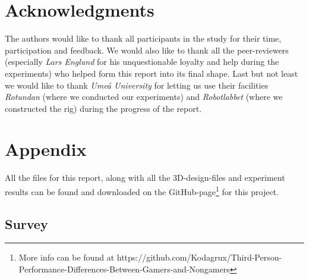 \documentclass[runningheads,a4paper,oribibl]{llncs}
\begin{document}
\section{Acknowledgments}
The authors would like to thank all participants in the study for their time, participation and feedback. We would also like to thank all the peer-reviewers (especially \emph{Lars Englund} for his unquestionable loyalty and help during the experiments) who helped form this report into its final shape. Last but not least we would like to thank \emph{Umeå University} for letting us use their facilities \emph{Rotundan} (where we conducted our experiments) and \emph{Robotlabbet} (where we constructed the rig) during the progress of the report.








%



\appendix

\section{Appendix}
All the files for this report, along with all the 3D-design-files and experiment results can be found and downloaded on the GitHub-page\footnote{More info can be found at https://github.com/Kodagrux/Third-Person-Performance-Differences-Between-Gamers-and-Nongamers} for this project.
\subsection{Survey} \label{subsec:Survey}

\end{document}
